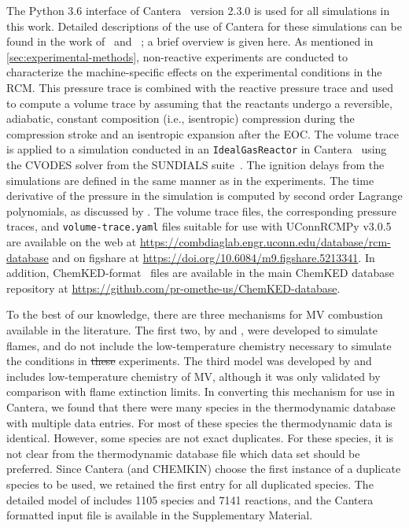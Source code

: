\documentclass[letterpaper, review, sort&compress]{elsarticle}
\providecommand{\DIFadd}[1]{{\protect\color{blue}\uwave{#1}}} %
\providecommand{\DIFdel}[1]{{\protect\color{red}\sout{#1}}}                      %
\providecommand{\DIFaddbegin}{} %
\providecommand{\DIFaddend}{} %
\providecommand{\DIFdelbegin}{} %
\providecommand{\DIFdelend}{} %
\newcommand{\DIFscaledelfig}{0.5}
\newlength{\DIFdelgraphicswidth} %
\newlength{\DIFdelgraphicsheight} %
\newcommand{\DIFaddincludegraphics}[2][]{{\color{blue}\fbox{\DIFOincludegraphics[#1]{#2}}}} %
\newcommand{\DIFdelincludegraphics}[2][]{%
\sbox{\DIFdelgraphicsbox}{\DIFOincludegraphics[#1]{#2}}%
\settoboxwidth{\DIFdelgraphicswidth}{\DIFdelgraphicsbox} %
\settoboxtotalheight{\DIFdelgraphicsheight}{\DIFdelgraphicsbox} %
\scalebox{\DIFscaledelfig}{%
\parbox[b]{\DIFdelgraphicswidth}{\usebox{\DIFdelgraphicsbox}\\[-\baselineskip] \rule{\DIFdelgraphicswidth}{0em}}\llap{\resizebox{\DIFdelgraphicswidth}{\DIFdelgraphicsheight}{%
\setlength{\unitlength}{\DIFdelgraphicswidth}%
\begin{picture}(1,1)%
\thicklines\linethickness{2pt} %
{\color[rgb]{1,0,0}\put(0,0){\framebox(1,1){}}}%
{\color[rgb]{1,0,0}\put(0,0){\line( 1,1){1}}}%
{\color[rgb]{1,0,0}\put(0,1){\line(1,-1){1}}}%
\end{picture}%
}\hspace*{3pt}}} %
} %
\DeclareRobustCommand{\DIFaddbegin}{\DIFOaddbegin \let\includegraphics\DIFaddincludegraphics} %
\DeclareRobustCommand{\DIFaddend}{\DIFOaddend \let\includegraphics\DIFOincludegraphics} %
\DeclareRobustCommand{\DIFdelbegin}{\DIFOdelbegin \let\includegraphics\DIFdelincludegraphics} %
\DeclareRobustCommand{\DIFdelend}{\DIFOaddend \let\includegraphics\DIFOincludegraphics} %
\begin{document}
The Python 3.6 interface of Cantera~\cite{cantera} version 2.3.0 is used for all simulations in this
work. Detailed descriptions of the use of Cantera for these simulations can be found in the work
of~\citet{Weber2016a} and~ \citet{Dames2016}; a brief overview is given here. As mentioned in
\cref{sec:experimental-methods}, non-reactive experiments are conducted to characterize the
machine-specific effects on the experimental conditions in the RCM. This pressure trace is combined
with the reactive pressure trace and used to compute a volume trace by assuming that the reactants
undergo a reversible, adiabatic, constant composition (i.e., isentropic) compression during the
compression stroke and an isentropic expansion after the EOC. The volume trace is applied to a
simulation conducted in an \verb|IdealGasReactor| in Cantera~\cite{cantera} using the CVODES solver
from the SUNDIALS suite~\cite{Hindmarsh2005}. The ignition delays from the simulations are defined
in the same manner as in the experiments. The time derivative of the pressure in the simulation is
computed by second order Lagrange polynomials, as discussed by \citet{Chapra2010}. The volume trace
files, the corresponding pressure traces, and \texttt{volume-trace.yaml} files suitable for use with
UConnRCMPy v3.0.5~\cite{uconnrcmpy} are available on the web at
\url{https://combdiaglab.engr.uconn.edu/database/rcm-database} and on figshare at
\url{https://doi.org/10.6084/m9.figshare.5213341}. In addition, ChemKED-format~\cite{Weber2017}
files are available in the main ChemKED database repository at
\url{https://github.com/pr-omethe-us/ChemKED-database}.


To the best of our knowledge, there are three mechanisms for MV combustion available in the
literature. The first two, by \citet{Korobeinichev2015} and \citet{Dmitriev2015}, were developed to
simulate flames, and do not include the low-temperature chemistry necessary to simulate the
conditions in \DIFdelbegin \DIFdel{these }\DIFdelend \DIFaddbegin \DIFadd{the current RCM }\DIFaddend experiments. The third model was developed by \citet{Dievart2013} and
includes low-temperature chemistry of MV, although it was only validated by comparison with flame
extinction limits. In converting this mechanism for use in Cantera, we found that there were many
species in the thermodynamic database with multiple data entries. For most of these species the
thermodynamic data is identical. However, some species are not exact duplicates. For these species,
it is not clear from the thermodynamic database file which data set should be preferred. Since
Cantera (and CHEMKIN) choose the first instance of a duplicate species to be used, we retained the
first entry for all duplicated species. The detailed model of \citet{Dievart2013} includes 1105
species and 7141 reactions, and the Cantera formatted input file is available in the Supplementary
Material.
\end{document}
